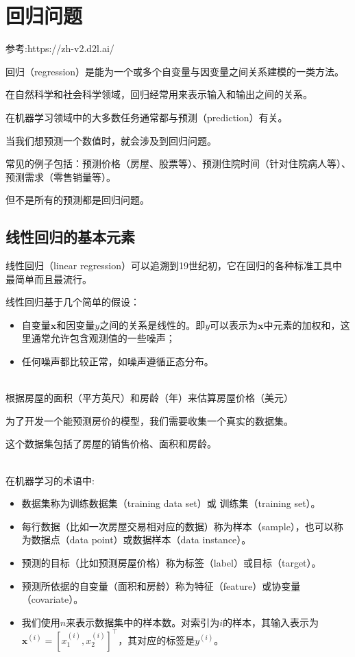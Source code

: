 \documentclass[openany,11pt]{book}
\begin{document}
\chapter{回归问题}

参考:https://zh-v2.d2l.ai/

回归（regression）是能为一个或多个自变量与因变量之间关系建模的一类方法。

在自然科学和社会科学领域，回归经常用来表示输入和输出之间的关系。

在机器学习领域中的大多数任务通常都与预测（prediction）有关。

当我们想预测一个数值时，就会涉及到回归问题。

常见的例子包括：预测价格（房屋、股票等）、预测住院时间（针对住院病人等）、预测需求（零售销量等）。

但不是所有的预测都是回归问题。


\section{线性回归的基本元素}

线性回归（linear regression）可以追溯到19世纪初，它在回归的各种标准工具中最简单而且最流行。

线性回归基于几个简单的假设：

\begin{itemize}
	\item 自变量$\mathbf{x}$和因变量$y$之间的关系是线性的。即$y$可以表示为$\mathbf{x}$中元素的加权和，这里通常允许包含观测值的一些噪声；
	\item 任何噪声都比较正常，如噪声遵循正态分布。
\end{itemize}

~\\
{\color{red}根据房屋的面积（平方英尺）和房龄（年）来估算房屋价格（美元）}

为了开发一个能预测房价的模型，我们需要收集一个真实的数据集。

这个数据集包括了房屋的销售价格、面积和房龄。

~\\
在机器学习的术语中:
\begin{itemize}
	\item 数据集称为训练数据集（training data set）或 训练集（training set）。
	\item 每行数据（比如一次房屋交易相对应的数据）称为样本（sample），也可以称为数据点（data point）或数据样本（data instance）。
	\item 预测的目标（比如预测房屋价格）称为标签（label）或目标（target）。
	\item 预测所依据的自变量（面积和房龄）称为特征（feature）或协变量（covariate）。
	\item 我们使用$n$来表示数据集中的样本数。对索引为$i$的样本，其输入表示为$\mathbf{x}^{(i)} = [x_1^{(i)}, x_2^{(i)}]^\top$，其对应的标签是$y^{(i)}$。
\end{itemize}
\end{document}
